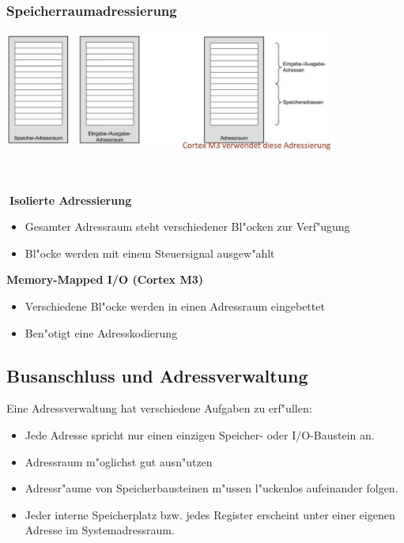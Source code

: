 \subsubsection{Speicherraumadressierung}
\begin{minipage}{11cm}
	\includegraphics[width=11cm]{images/Speicherraumadressierung}
\end{minipage}
%
\begin{minipage}{0.5cm}
	\-\
\end{minipage}
%
\begin{minipage}{7cm}
	\textbf{Isolierte Adressierung}
	\begin{itemize}
		\item Gesamter Adressraum steht verschiedener Bl"ocken zur Verf"ugung
		\item Bl"ocke werden mit einem Steuersignal ausgew"ahlt
	\end{itemize}
	\textbf{Memory-Mapped I/O (Cortex M3)}
	\begin{itemize}
		\item Verschiedene Bl"ocke werden in einen Adressraum eingebettet
		\item Ben"otigt eine Adresskodierung
	\end{itemize}
\end{minipage}

\newpage
\subsection{Busanschluss und Adressverwaltung}
Eine Adressverwaltung hat verschiedene Aufgaben zu erf"ullen:
\begin{itemize}
	\item Jede Adresse spricht nur einen einzigen Speicher- oder I/O-Baustein an.
	\item Adressraum m"oglichst gut ausn"utzen
	\item Adressr"aume von Speicherbausteinen m"ussen l"uckenlos aufeinander folgen.
	\item Jeder interne Speicherplatz bzw. jedes Register erscheint unter einer eigenen Adresse im Systemadressraum.
\end{itemize}

